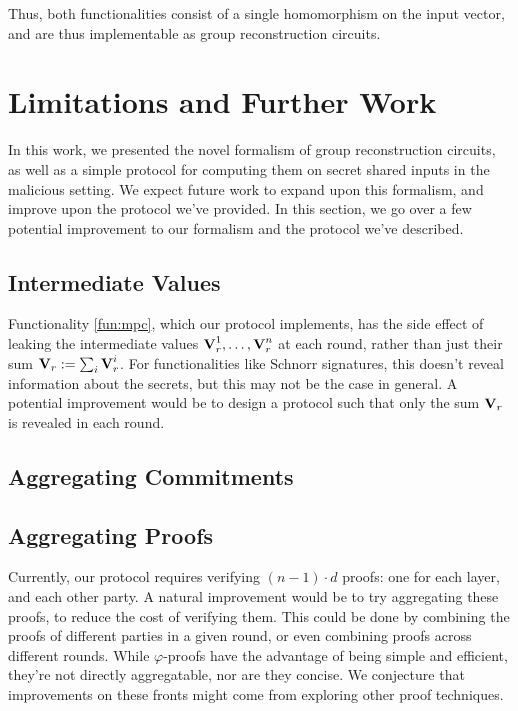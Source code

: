 Thus, both functionalities consist of a single homomorphism
on the input vector, and are thus implementable as group reconstruction
circuits.

\section{Limitations and Further Work}

In this work, we presented the novel formalism
of group reconstruction circuits, as well as a simple
protocol for computing them on secret shared inputs in the
malicious setting.
We expect future work to expand upon this formalism,
and improve upon the protocol we've provided.
In this section, we go over a few potential improvement
to our formalism and the protocol we've described.

\subsection{Intermediate Values}

Functionality \ref{fun:mpc}, which our protocol implements,
has the side effect of leaking the intermediate values
$\textbf{V}^1_r, \ldots, \textbf{V}^n_r$ at each round,
rather than just their sum $\textbf{V}_r := \sum_i \textbf{V}^i_r$.
For functionalities like Schnorr signatures, this doesn't
reveal information about the secrets,
but this may not be the case in general.
A potential improvement would be to design a protocol
such that only the sum $\textbf{V}_r$ is revealed in each round.

\subsection{Aggregating Commitments}

\subsection{Aggregating Proofs}

Currently, our protocol requires verifying
$(n - 1) \cdot d$ proofs: one for each layer, and each other party.
A natural improvement would be to try aggregating these
proofs, to reduce the cost of verifying them.
This could be done by combining the proofs of different parties
in a given round, or even combining proofs across different rounds.
While $\varphi$-proofs have the advantage of being
simple and efficient, they're not directly aggregatable, nor
are they concise.
We conjecture that improvements on these fronts might come from
exploring other proof techniques.

